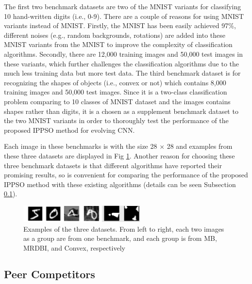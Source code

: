 \documentclass[conference]{IEEEtran}
\begin{document}
The first two benchmark datasets are two of the MNIST \cite{DocumentRecognition:LeCun} variants for classifying 10 hand-written digits (i.e., 0-9). There are a couple of reasons for using MNIST variants instead of MNIST. Firstly, the MNIST has been easily achieved 97\%, different noises (e.g., random backgrounds, rotations) are added into these MNIST variants from the MNIST to improve the complexity of classification algorithms. Secondly, there are 12,000 training images and 50,000 test images in these variants, which further challenges the classification algorithms due to the much less training data but more test data. The third benchmark dataset is for recognizing the shapes of objects (i.e., convex or not) which contains 8,000 training images and 50,000 test images. Since it is a two-class classification problem comparing to 10 classes of MNIST dataset and the images contains shapes rather than digits, it is a chosen as a supplement benchmark dataset to the two MNIST variants in order to thoroughly test the performance of the proposed IPPSO method for evolving CNN. 

Each image in these benchmarks is with the size 28 × 28 and examples from these three datasets are displayed in Fig \ref{fig:images}. Another reason for choosing these three benchmark datasets is that different algorithms have reported their promising results, so is convenient for comparing the performance of the proposed IPPSO method with these existing algorithms (details can be seen Subsection \ref{secpeer-competitors}).

\begin{figure}[!t]
	\centering
	\includegraphics[width=2.5in]{ippso_image_samples}
	\caption{Examples of the three datasets. From left to right, each two images as a group are from one benchmark, and each group is from MB, MRDBI, and Convex, respectively}
	\label{fig:images}
\end{figure}


\subsection{Peer Competitors}\label{secpeer-competitors}
\end{document}
